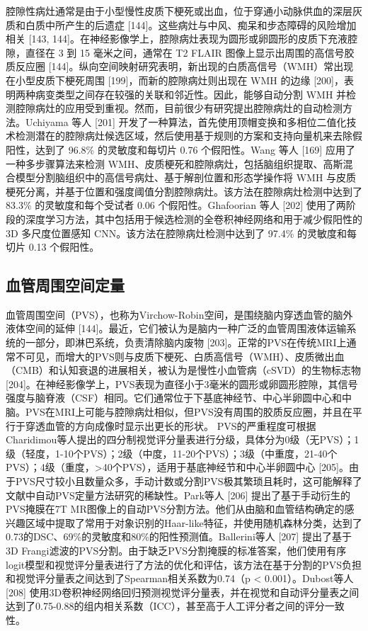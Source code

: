 \documentclass[11pt]{article}
\begin{document}
腔隙性病灶通常是由于小型慢性皮质下梗死或出血，位于穿通小动脉供血的深层灰质和白质中所产生的后遗症 [144]。这些病灶与中风、痴呆和步态障碍的风险增加相关 [143, 144]。在神经影像学上，腔隙病灶表现为圆形或卵圆形的皮质下充液腔隙，直径在 3 到 15 毫米之间，通常在 T2 FLAIR 图像上显示出周围的高信号胶质反应圈 [144]。纵向空间映射研究表明，新出现的白质高信号（WMH）常出现在小型皮质下梗死周围 [199]，而新的腔隙病灶则出现在 WMH 的边缘 [200]，表明两种病变类型之间存在较强的关联和邻近性。因此，能够自动分割 WMH 并检测腔隙病灶的应用受到重视。然而，目前很少有研究提出腔隙病灶的自动检测方法。Uchiyama 等人 [201] 开发了一种算法，首先使用顶帽变换和多相位二值化技术检测潜在的腔隙病灶候选区域，然后使用基于规则的方案和支持向量机来去除假阳性，达到了 96.8\% 的灵敏度和每切片 0.76 个假阳性。Wang 等人 [169] 应用了一种多步骤算法来检测 WMH、皮质梗死和腔隙病灶，包括脑组织提取、高斯混合模型分割脑组织中的高信号病灶、基于解剖位置和形态学操作将 WMH 与皮质梗死分离，并基于位置和强度阈值分割腔隙病灶。该方法在腔隙病灶检测中达到了 83.3\% 的灵敏度和每个受试者 0.06 个假阳性。Ghafoorian 等人 [202] 使用了两阶段的深度学习方法，其中包括用于候选检测的全卷积神经网络和用于减少假阳性的 3D 多尺度位置感知 CNN。该方法在腔隙病灶检测中达到了 97.4\% 的灵敏度和每切片 0.13 个假阳性。

\subsection{\kaishu 血管周围空间定量}

血管周围空间（PVS），也称为Virchow-Robin空间，是围绕脑内穿透血管的脑外液体空间的延伸 [144]。最近，它们被认为是脑内一种广泛的血管周围液体运输系统的一部分，即淋巴系统，负责清除脑内废物 [203]。正常的PVS在传统MRI上通常不可见，而增大的PVS则与皮质下梗死、白质高信号（WMH）、皮质微出血（CMB）和认知衰退的进展相关，被认为是慢性小血管病（cSVD）的生物标志物 [204]。在神经影像学上，PVS表现为直径小于3毫米的圆形或卵圆形腔隙，其信号强度与脑脊液（CSF）相同。它们通常位于下基底神经节、中心半卵圆中心和中脑。PVS在MRI上可能与腔隙病灶相似，但PVS没有周围的胶质反应圈，并且在平行于穿透血管的方向成像时显示出更长的形状。 PVS的严重程度可根据Charidimou等人提出的四分制视觉评分量表进行分级，具体分为0级（无PVS）；1级（轻度，1-10个PVS）；2级（中度，11-20个PVS）；3级（中重度，21-40个PVS）；4级（重度，>40个PVS），适用于基底神经节和中心半卵圆中心 [205]。由于PVS尺寸较小且数量众多，手动计数或分割PVS极其繁琐且耗时，这可能解释了文献中自动PVS定量方法研究的稀缺性。Park等人 [206] 提出了基于手动衍生的PVS掩膜在7T MR图像上的自动PVS分割方法。他们从由脑和血管结构确定的感兴趣区域中提取了常用于对象识别的Haar-like特征，并使用随机森林分类，达到了0.73的DSC、69\%的灵敏度和80\%的阳性预测值。Ballerini等人 [207] 提出了基于3D Frangi滤波的PVS分割。由于缺乏PVS分割掩膜的标准答案，他们使用有序logit模型和视觉评分量表进行了方法的优化和评估，该方法在基于分割的PVS负担和视觉评分量表之间达到了Spearman相关系数为0.74（p < 0.001）。Dubost等人 [208] 使用3D卷积神经网络回归预测视觉评分量表，并在视觉和自动评分量表之间达到了0.75-0.88的组内相关系数（ICC），甚至高于人工评分者之间的评分一致性。
\end{document}
